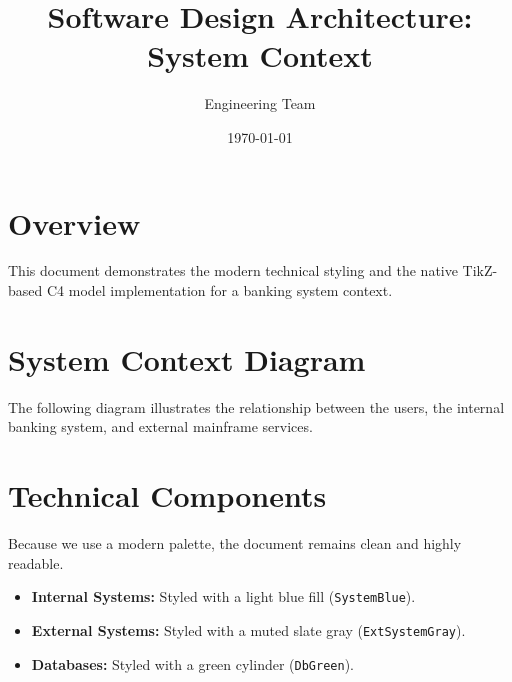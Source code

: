 \documentclass{modern-c4}
\title{Software Design Architecture: System Context}
\author{Engineering Team}
\date{\today}
\begin{document}
\maketitle

\section{Overview}
This document demonstrates the modern technical styling and the native TikZ-based C4 model implementation for a banking system context.

\section{System Context Diagram}
The following diagram illustrates the relationship between the users, the internal banking system, and external mainframe services.

\begin{center}
\end{center}

\section{Technical Components}
Because we use a modern palette, the document remains clean and highly readable.

\begin{itemize}
    \item \textbf{Internal Systems:} Styled with a light blue fill (\texttt{SystemBlue}).
    \item \textbf{External Systems:} Styled with a muted slate gray (\texttt{ExtSystemGray}).
    \item \textbf{Databases:} Styled with a green cylinder (\texttt{DbGreen}).
\end{itemize}
\end{document}
